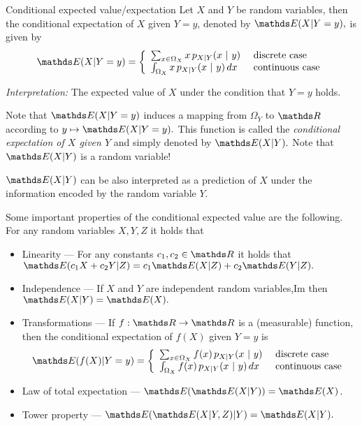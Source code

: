 \begin{vbframe}{Conditional expected value/expectation} 
%	
	Let $X$ and $Y$ be random variables, then the conditional expectation of $X$ given $Y=y$, denoted by $\E(X|Y=y),$ is given by
	$$	\E(X|Y=y) = \left\{ \begin{array}{ll}
		\sum_{x \in \Omega_X} x \, p_{X|Y}(x ~|~ y) & \text{ discrete case} \\
		\int_{\Omega_X} x \, p_{X|Y}(x ~|~ y) \, dx& \text{ continuous case} 
	\end{array} \right.  	$$
	
	\emph{Interpretation:} The expected value of $X$ under the condition that $Y=y$ holds.
	\lz
	
	Note that $\E(X|Y=y)$ induces a mapping from $\Omega_Y$ to $\R$ according to $y \mapsto \E(X|Y=y).$
	This function is called the \emph{conditional expectation of $X$ given $Y$} and simply denoted by $\E(X|Y).$
	Note that $\E(X|Y)$ is a random variable!
	
	\lz
	
	$\E(X|Y)$ can be also interpreted as a prediction of $X$ under the information encoded by the random variable $Y.$
	
	\framebreak
	
	
	Some important properties of the conditional expected value are the following. For any random variables $X,Y,Z$ it holds that
	\begin{itemize}
		\item Linearity ---  For any constants $c_1,c_2 \in \R$  it holds that $ \E(c_1 X + c_2 Y | Z) = c_1 \E(X|Z) + c_2 \E(Y|Z).$
		\item Independence --- If $X$ and $Y$ are independent random variables,Im then $\E(X|Y)=\E(X).$
		\item Transformations --- If $f:\R \to \R$  is a (measurable) function, then the conditional expectation of $f(X)$ given $Y=y$ is 
		$$\E(f(X)|Y=y)  = \left\{ \begin{array}{ll}
			\sum_{x \in \Omega_X} f(x) \, p_{X|Y}(x ~|~ y) & \text{ discrete case} \\
			\int_{\Omega_X} f(x) \, p_{X|Y}(x ~|~ y) \, dx & \text{ continuous case} 
		\end{array} \right.  	$$
		\item Law of total expectation ---
		$\E(\E(X|Y)) = \E(X)$.  
		\item Tower property --- $ \E(\E(X|Y,Z)|Y) = \E(X|Y).$
	\end{itemize}
	
\end{vbframe}


